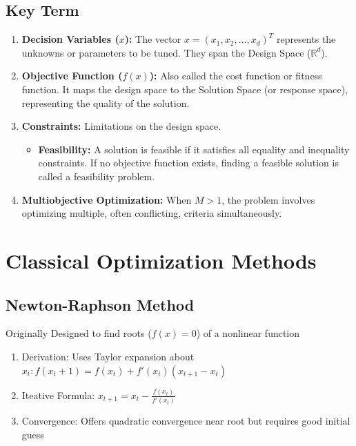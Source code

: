 \documentclass[12pt]{article}
\begin{document}
\subsection{Key Term}
\begin{enumerate}
    \item \textbf{Decision Variables ($x$):} The vector $x = (x_1, x_2, \ldots, x_d)^T$ represents the unknowns or parameters to be tuned. They span the Design Space ($\mathbb{R}^d$).

    \item \textbf{Objective Function ($f(x)$):} Also called the cost function or fitness function. It maps the design space to the Solution Space (or response space), representing the quality of the solution.

    \item \textbf{Constraints:} Limitations on the design space.
          \begin{itemize}
              \item \textbf{Feasibility:} A solution is feasible if it satisfies all equality and inequality constraints. If no objective function exists, finding a feasible solution is called a feasibility problem.
          \end{itemize}

    \item \textbf{Multiobjective Optimization:} When $M > 1$, the problem involves optimizing multiple, often conflicting, criteria simultaneously.
\end{enumerate}


\section{Classical Optimization Methods}

\subsection{Newton-Raphson Method}

Originally Designed to find roots ($f(x) = 0$) of a nonlinear function

\begin{enumerate}
    \item Derivation: Uses Taylor expansion about $x_t: f(x_t+1) = f(x_t) + f'(x_t)(x_{t+1} - x_t)$
    \item Iteative Formula: $x_{t+1} = x_t - \frac{f(x_t)}{f'(x_t)}$
    \item Convergence: Offers quadratic convergence near root but requires good initial guess
\end{enumerate}
\end{document}
